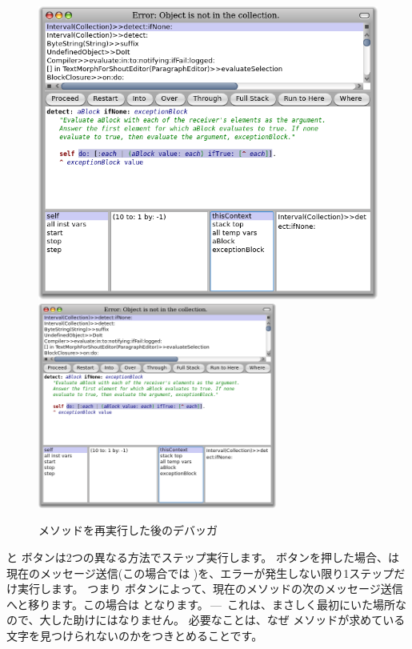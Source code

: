\documentclass[a4paper,10pt,twoside]{book}
\begin{document}
\begin{figure}[btp]
\begin{center}
\ifluluelse
{\includegraphics[width=\textwidth]{RestartDetectIfNone}}
{\includegraphics[width=0.7\textwidth]{RestartDetectIfNone}}
\end{center}
\caption{ メソッドを再実行した後のデバッガ}
\end{figure}

 と  ボタンは2つの異なる方法でステップ実行します。 ボタンを押した場合、\pharo は現在のメッセージ送信(この場合では )を、エラーが発生しない限り1ステップだけ実行します。
つまり  ボタンによって、現在のメソッドの次のメッセージ送信へと移ります。この場合は  となります。\,---\, これは、まさしく最初にいた場所なので、大した助けにはなりません。
必要なことは、なぜ  メソッドが求めている文字を見つけられないのかをつきとめることです。
\end{document}
